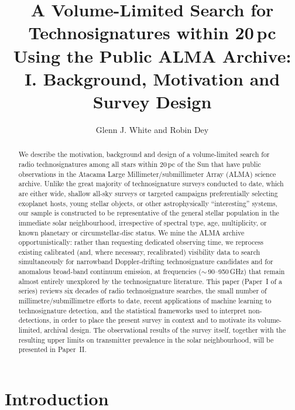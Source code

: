 \documentclass{openjournal}
\begin{document}
\title{A Volume-Limited Search for Technosignatures within 20\,pc Using the Public ALMA Archive: I. Background, Motivation and Survey Design}

\author{Glenn J. White and Robin Dey}

\begin{abstract}
We describe the motivation, background and design of a volume-limited search for
radio technosignatures among all stars within 20\,pc of the Sun that have public
observations in the Atacama Large Millimeter/submillimeter Array (ALMA) science
archive. Unlike the great majority of technosignature surveys conducted to date,
which are either wide, shallow all-sky surveys or targeted campaigns preferentially
selecting exoplanet hosts, young stellar objects, or other astrophysically
``interesting'' systems, our sample is constructed to be representative of the
general stellar population in the immediate solar neighbourhood, irrespective of
spectral type, age, multiplicity, or known planetary or circumstellar-disc status.
We mine the ALMA archive opportunistically: rather than requesting dedicated
observing time, we reprocess existing calibrated (and, where necessary,
recalibrated) visibility data to search simultaneously for narrowband
Doppler-drifting technosignature candidates and for anomalous broad-band continuum
emission, at frequencies ($\sim$\,90--950\,GHz) that remain almost entirely
unexplored by the technosignature literature. This paper (Paper~I of a series)
reviews six decades of radio technosignature searches, the small number of
millimetre/submillimetre efforts to date, recent applications of machine learning
to technosignature detection, and the statistical frameworks used to interpret
non-detections, in order to place the present survey in context and to motivate
its volume-limited, archival design. The observational results of the survey
itself, together with the resulting upper limits on transmitter prevalence in the
solar neighbourhood, will be presented in Paper~II.
\end{abstract}


\section{Introduction}
\label{sec:intro}
\end{document}
